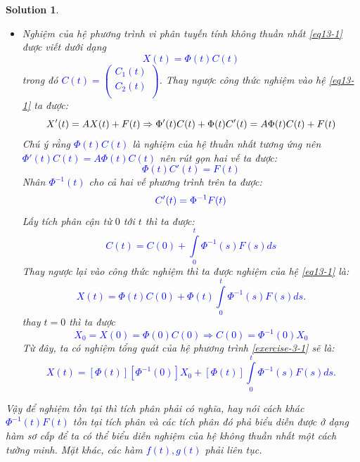 \documentclass[a4paper]{article}
\newtheorem*{sol}{Solution}
\begin{document}
\begin{sol}
\begin{itemize}
 Vì \textcolor{blue}{$R, J$} là các hàm số phân biên nên $\Phi(t)$ có hai vector độc lập tuyến tính nên ma trận \textcolor{blue}{$\Phi(t)$} khả nghịch và có nghịch đảo là: 
 \textcolor{blue}{$$\Phi^{-1}(t) = \dfrac{1}{\det(\Phi(t))}\begin{pmatrix}
     \alpha_4 e^{\lambda_2 t} & -\alpha_3 e^{\lambda_2 t} \\
     -\alpha_2 e^{\lambda_1 t} & \alpha_1 e^{\lambda_1 t}
 \end{pmatrix}
 $$}

 \item Nghiệm  của hệ phương trình vi phân tuyến tính không thuần nhất \textcolor{blue}{\eqref{eq13-1}} được viết dưới dạng 
 \textcolor{blue}{$$X(t) = \Phi(t)C(t)$$}
 trong đó \textcolor{blue}{$C(t) = \begin{pmatrix}
     C_1(t) \\
     C_2(t) \\
 \end{pmatrix}$}. Thay ngược công thức nghiệm vào hệ \eqref{eq13-1} ta được: 
\textcolor{blue}{ $$X'(t)=AX(t)+F(t)
\newline
\Rightarrow \Phi'(t)C(t)+\Phi(t) C'(t)=A\Phi(t)C(t)+F(t)$$}
Chú ý rằng \textcolor{blue}{$\Phi(t)C(t)$} là nghiệm của hệ thuần nhất tương ứng nên \textcolor{blue}{$\Phi'(t)C(t) = A\Phi(t)C(t)$} nên rút gọn hai vế ta được: 
\textcolor{blue}{$$\Phi(t)C'(t)=F(t)$$}
Nhân \textcolor{blue}{$\Phi^{-1}(t)$} cho cả hai vế phương trình trên ta được: 
$$\textcolor{blue}{C'(t) = \Phi^{-1}F(t)}$$
Lấy tích phân cận từ $0$ tới $t$ thì ta được: 
\textcolor{blue}{$$ C(t)=C(0) +\int\limits_{0}^{t}\Phi^{-1}(s)F(s)ds$$}
Thay ngược lại vào công thức nghiệm thì ta được nghiệm của hệ \eqref{eq13-1} là: 
\textcolor{blue}{$$ X(t) = \Phi(t)C(0)+\Phi(t)\int\limits_{0}^{t} \Phi^{-1}(s)F(s)ds .$$}
thay $t = 0$ thì ta được 
\textcolor{blue}{$$X_0 = X(0) = \Phi(0)C(0) \Rightarrow C(0) = \Phi^{-1}(0)X_0 $$}
Từ đây, ta có nghiệm tổng quát của hệ phương trình \eqref{exercise-3-1} sẽ là: 
\textcolor{blue}{$$ X(t) = [\Phi(t)][\Phi^{-1}(0)]X_0+[\Phi(t)]\int\limits_{0}^{t} \Phi^{-1}(s)F(s)ds .$$}
\end{itemize}
\hspace{1cm}Vậy để nghiệm tồn tại thì tích phân phải có nghĩa, hay nói cách khác \textcolor{blue}{$\Phi^{-1}(t)F(t)$} tồn tại tích phân và các tích phân đó phả biểu diễn được ở dạng hàm sơ cấp để ta có thể biểu diễn nghiệm của hệ không thuần nhất một cách tường minh. Mặt khác, các hàm \textcolor{blue}{$f(t), g(t)$} phải liên tục.


\end{sol}
\end{document}
